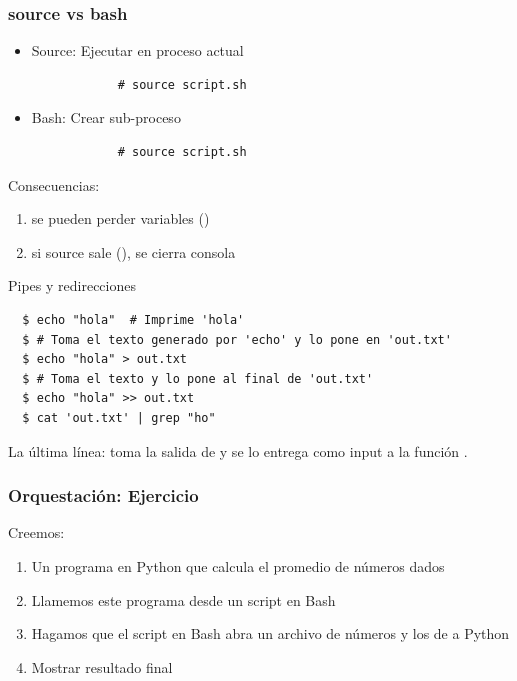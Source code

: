 \documentclass[14pt,aspectratio=169,xcolor=dvipsnames]{beamer}
\begin{document}
\begin{frame}[fragile]\frametitle{source vs bash}
    \begin{itemize}
        \item Source: Ejecutar en proceso actual
        \begin{verbatim}
            # source script.sh
        \end{verbatim}
        \item Bash: Crear sub-proceso
        \begin{verbatim}
            # source script.sh
        \end{verbatim}
    \end{itemize}

Consecuencias: 
    \begin{enumerate}
        \item se pueden perder variables ()
        \item  si source sale (), se cierra consola
    \end{enumerate}


\end{frame}
\begin{frame}[fragile]{Pipes y redirecciones}
    \begin{small}
    \begin{verbatim}
  $ echo "hola"  # Imprime 'hola'
  $ # Toma el texto generado por 'echo' y lo pone en 'out.txt'
  $ echo "hola" > out.txt 
  $ # Toma el texto y lo pone al final de 'out.txt'
  $ echo "hola" >> out.txt 
  $ cat 'out.txt' | grep "ho"
    \end{verbatim} 
    \end{small}
La última línea: toma la salida de  y se lo entrega como input a la función .

\end{frame}
\begin{frame}[fragile]\frametitle{Orquestación: Ejercicio}
    Creemos: 
    \begin{enumerate}
        \item Un programa en Python que calcula el promedio de números dados
        \item Llamemos este programa desde un script en Bash
        \item Hagamos que el script en Bash abra un archivo de números y los de a Python
        \item Mostrar resultado final
    \end{enumerate}
\end{frame}
\end{document}

